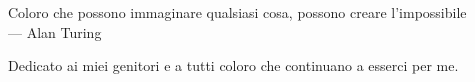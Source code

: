 \cleardoublepage
{}
\thispagestyle{empty}

\vspace*{3cm}

\begin{center}
    Coloro che possono immaginare qualsiasi cosa, possono creare l'impossibile \\ \medskip
    --- Alan Turing
\end{center}

\medskip

\begin{center}
    Dedicato ai miei genitori e a tutti coloro che continuano a esserci per me.
\end{center}
